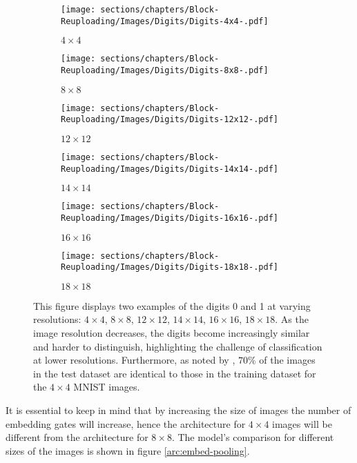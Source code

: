 \begin{figure}[H]
    \centering
    \begin{subfigure}[b]{0.45\textwidth}
        \texttt{[image: sections/chapters/Block-Reuploading/Images/Digits/Digits-4x4-.pdf]}
        \caption{$4\times4$}
    \end{subfigure}
    \begin{subfigure}[b]{0.45\textwidth}
        \texttt{[image: sections/chapters/Block-Reuploading/Images/Digits/Digits-8x8-.pdf]}
        \caption{$8\times8$}
    \end{subfigure}
    \begin{subfigure}[b]{0.45\textwidth}
        \texttt{[image: sections/chapters/Block-Reuploading/Images/Digits/Digits-12x12-.pdf]}
        \caption{$12\times12$}
    \end{subfigure}
    \begin{subfigure}[b]{0.45\textwidth}
        \texttt{[image: sections/chapters/Block-Reuploading/Images/Digits/Digits-14x14-.pdf]}
        \caption{$14\times14$}
    \end{subfigure}
    \begin{subfigure}[b]{0.45\textwidth}
        \texttt{[image: sections/chapters/Block-Reuploading/Images/Digits/Digits-16x16-.pdf]}
        \caption{$16\times16$}
    \end{subfigure}
    \begin{subfigure}[b]{0.45\textwidth}
        \texttt{[image: sections/chapters/Block-Reuploading/Images/Digits/Digits-18x18-.pdf]}
        \caption{$18\times18$}
    \end{subfigure}
    \caption{
        This figure displays two examples of the digits 0 and 1 at varying resolutions: $4\times4$, $8\times8$, 
        $12\times12$, $14\times14$, $16\times16$, $18\times18$.
        As the image resolution decreases, the digits become increasingly similar and harder to distinguish, 
        highlighting the challenge of classification at lower resolutions.
        Furthermore, as noted by \cite{bowles2024betterclassicalsubtleart}, $70\%$ of the images in the test dataset 
        are identical to those in the training dataset for the $4\times4$ MNIST images.}
    \label{fig:digits-sizes}
\end{figure}



It is essential to keep in mind that by increasing the size of images the number of embedding gates will
increase, hence the architecture for $4\times4$ images will be different 
from the architecture for $8\times8$.
The model's comparison for different sizes of the images is shown in figure \ref{arc:embed-pooling}.

